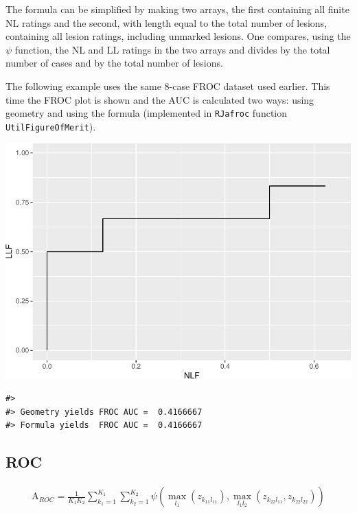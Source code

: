 \documentclass[
]{book}
\begin{document}
The formula can be simplified by making two arrays, the first containing all finite NL ratings and the second, with length equal to the total number of lesions, containing all lesion ratings, including unmarked lesions. One compares, using the \(\psi\) function, the NL and LL ratings in the two arrays and divides by the total number of cases and by the total number of lesions.

The following example uses the same 8-case FROC dataset used earlier. This time the FROC plot is shown and the AUC is calculated two ways: using geometry and using the formula (implemented in \texttt{RJafroc} function \texttt{UtilFigureOfMerit}).

\includegraphics{03-empirical_files/figure-latex/empirical-numerical2-1.pdf}

\begin{verbatim}
#> 
#> Geometry yields FROC AUC =  0.4166667
#> Formula yields  FROC AUC =  0.4166667
\end{verbatim}

\hypertarget{roc}{%
\subsection{ROC}\label{roc}}

\begin{equation}
\begin{aligned}
\text{A}_{ROC} = \frac{1}{K_1K_2}\sum_{k_1=1}^{K_1}\sum_{k_2=1}^{K_2} \psi\left ( \max_{l_1}\left (z_{k_11l_11} \right ), \max_{l_1l_2}\left (z_{k_22l_11}, z_{k_22l_22}  \right ) \right )
\end{aligned}
\label{eq:empirical-computational-roc}
\end{equation}
\end{document}
